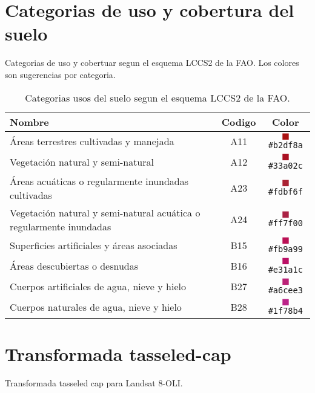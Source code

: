 \documentclass[hidelinks,12pt]{article}
\begin{document}
\section{Categorias de uso y cobertura del suelo}\label{apcate}
Categorias de uso y cobertuar segun el esquema LCCS2 de la FAO\@. Los colores son
sugerencias por categoria.
\begin{table}[hbt]
    \centering
    \begin{tabular}{p{11cm}cc}
        \toprule
        Nombre & Codigo & Color \\
        \midrule
        Áreas terrestres cultivadas y manejada & A11 & \textcolor{A11}{$\blacksquare$}\texttt{\#b2df8a}
        \\
        Vegetación natural y semi-natural & A12 & \textcolor{A12}{$\blacksquare$}\texttt{\#33a02c}\\
        Áreas acuáticas o regularmente inundadas cultivadas & A23  &
        \textcolor{A23}{$\blacksquare$}\texttt{\#fdbf6f}\\
        Vegetación natural y semi-natural acuática o
	regularmente inundadas & A24 & \textcolor{A24}{$\blacksquare$}\texttt{\#ff7f00}\\
        Superficies artificiales y áreas asociadas & B15  &
        \textcolor{B15}{$\blacksquare$}\texttt{\#fb9a99}\\
        Áreas descubiertas o desnudas & B16 & \textcolor{B16}{$\blacksquare$}\texttt{\#e31a1c}\\
        Cuerpos artificiales de agua, nieve y hielo & B27 &
        \textcolor{B27}{$\blacksquare$}\texttt{\#a6cee3}\\
        Cuerpos naturales de agua, nieve y hielo & B28&
        \textcolor{B28}{$\blacksquare$}\texttt{\#1f78b4}\\
        \bottomrule
    \end{tabular}
\caption{\label{tabla1}Categorias usos del suelo segun el esquema LCCS2 de la
FAO.}
\end{table}

\section{Transformada tasseled-cap}
Transformada tasseled cap para Landsat 8-OLI.
\end{document}
